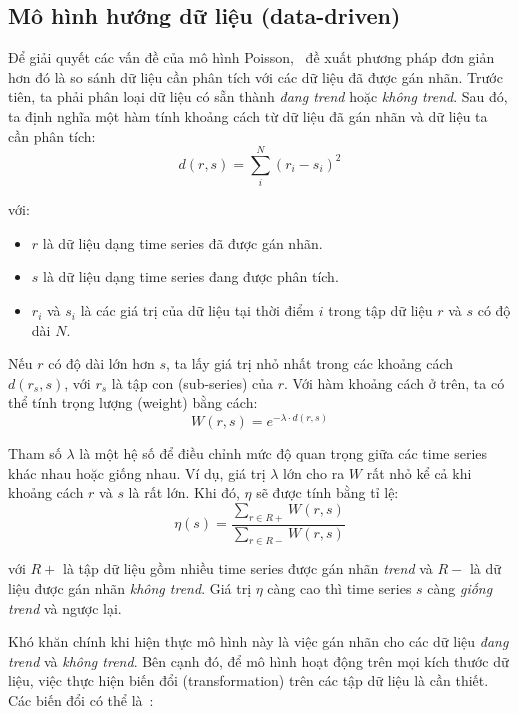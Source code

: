 \subsection{Mô hình hướng dữ liệu (data-driven)}
Để giải quyết các vấn đề của mô hình Poisson, \cite{hendricksonTrendDetectionSocial2015}~đề xuất phương pháp đơn giản hơn đó là so sánh dữ liệu cần phân tích với các dữ liệu đã được gán nhãn. Trước tiên, ta phải phân loại dữ liệu có sẵn thành \textit{đang trend} hoặc \textit{không trend}. Sau đó, ta định nghĩa một hàm tính khoảng cách từ dữ liệu đã gán nhãn và dữ liệu ta cần phân tích:
\[ d(r, s)=\sum_{i}^{N}\left(r_{i}-s_{i}\right)^{2} \]

với:
\begin{itemize}
	\item $r$ là dữ liệu dạng time series đã được gán nhãn.
	\item $s$ là dữ liệu dạng time series đang được phân tích.
	\item $r_{i}$ và $s_{i}$ là các giá trị của dữ liệu tại thời điểm $i$ trong tập dữ liệu $r$ và $s$ có độ dài $N$.
\end{itemize}

Nếu $r$ có độ dài lớn hơn $s$, ta lấy giá trị nhỏ nhất trong các khoảng cách $d(r_s, s)$, với $r_s$ là tập con (sub-series) của $r$. Với hàm khoảng cách ở trên, ta có thể tính trọng lượng (weight) bằng cách: \[ W(r,s)=e^{-\lambda \cdot d(r,s)} \]

Tham số $\lambda$ là một hệ số để điều chỉnh mức độ quan trọng giữa các time series khác nhau hoặc giống nhau. Ví dụ, giá trị $\lambda$ lớn cho ra $W$ rất nhỏ kể cả khi khoảng cách $r$ và $s$ là rất lớn. Khi đó, $\eta$ sẽ được tính bằng tỉ lệ:
\[
\eta(s)=\frac{\sum_{r \in R+} W(r, s)}{\sum_{r \in R-} W(r, s)}
\]

với $R+$ là tập dữ liệu gồm nhiều time series được gán nhãn \textit{trend} và $R-$ là dữ liệu được gán nhãn \textit{không trend}. Giá trị $\eta$ càng cao thì time series $s$ càng \textit{giống trend} và ngược lại.

Khó khăn chính khi hiện thực mô hình này là việc gán nhãn cho các dữ liệu \textit{đang trend} và \textit{không trend}. Bên cạnh đó, để mô hình hoạt động trên mọi kích thước dữ liệu, việc thực hiện biến đổi (transformation) trên các tập dữ liệu là cần thiết. Các biến đổi có thể là~\cite{nikolovTrendNoTrend2012}:

